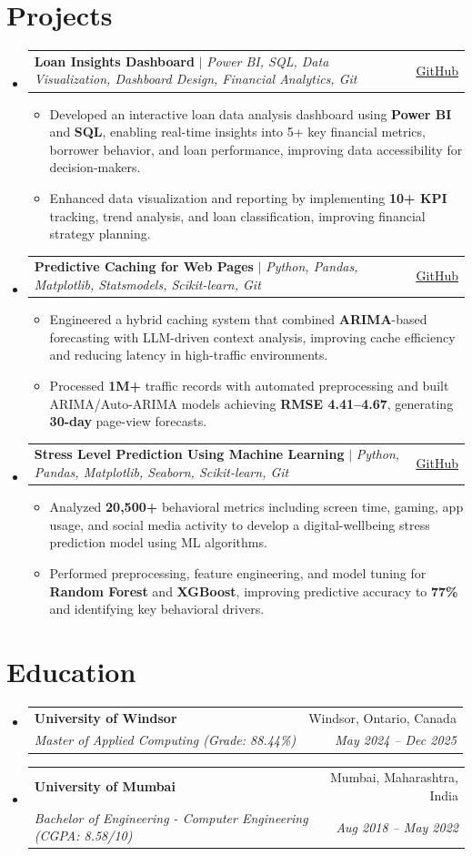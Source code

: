 \documentclass[letterpaper,10pt]{article}
\makeatletter
\newcommand{\resumeItem}[1]{
  \item\small{
    {#1 \vspace{-2pt}}
  }
}
\newcommand{\resumeSubheading}[4]{
  \vspace{-2pt}\item
    \begin{tabular*}{0.97\textwidth}[t]{l@{\extracolsep{\fill}}r}
      \textbf{#1} & #2 \\
      \textit{\small#3} & \textit{\small #4} \\
    \end{tabular*}\vspace{-7pt}
}
\newcommand{\resumeProjectHeading}[2]{
    \item
    \begin{tabular*}{0.97\textwidth}{l@{\extracolsep{\fill}}r}
      \small#1 & \small#2 \\
    \end{tabular*}\vspace{-7pt}
}
\newcommand{\resumeSubHeadingListStart}{\begin{itemize}[leftmargin=0in, label={}]}
\newcommand{\resumeSubHeadingListEnd}{\end{itemize}}
\newcommand{\resumeItemListStart}{\begin{itemize}}
\newcommand{\resumeItemListEnd}{\end{itemize}\vspace{-5pt}}
\makeatother
\begin{document}
\section{Projects}
\resumeSubHeadingListStart
\resumeProjectHeading
{\textbf{Loan Insights Dashboard} $|$ \emph{Power BI, SQL, Data Visualization, Dashboard Design, Financial Analytics, Git}}{\href{https://github.com/aaryen-dsouza/Loan_Insights_Dashboard}{\underline{GitHub}}}
\resumeItemListStart
\resumeItem{Developed an interactive loan data analysis dashboard using \textbf{Power BI} and \textbf{SQL}, enabling real-time insights into 5+ key financial metrics, borrower behavior, and loan performance, improving data accessibility for decision-makers.}
\resumeItem{Enhanced data visualization and reporting by implementing \textbf{10+ KPI} tracking, trend analysis, and loan classification, improving financial strategy planning.}
\resumeItemListEnd
\resumeProjectHeading
{\textbf{Predictive Caching for Web Pages} $|$ \emph{Python, Pandas, Matplotlib, Statsmodels, Scikit-learn, Git}}{\href{https://github.com/sharansukesh1003/COMP-8157-Final-Project}{\underline{GitHub}}}
\resumeItemListStart
\resumeItem{Engineered a hybrid caching system that combined \textbf{ARIMA}-based forecasting with LLM-driven context analysis, improving cache efficiency and reducing latency in high-traffic environments.}
\resumeItem{Processed \textbf{1M+} traffic records with automated preprocessing and built ARIMA/Auto-ARIMA models achieving \textbf{RMSE 4.41–4.67}, generating \textbf{30-day} page-view forecasts.}

\resumeItemListEnd
\resumeProjectHeading
{\textbf{Stress Level Prediction Using Machine Learning} $|$ \emph{Python, Pandas, Matplotlib, Seaborn, Scikit-learn, Git}}{\href{https://github.com/aaryen-dsouza/stress-prediction-ml}{\underline{GitHub}}}
\resumeItemListStart
\resumeItem{Analyzed \textbf{20,500+} behavioral metrics including screen time, gaming, app usage, and social media activity to develop a digital-wellbeing stress prediction model using ML algorithms.}

\resumeItem{Performed preprocessing, feature engineering, and model tuning for \textbf{Random Forest} and \textbf{XGBoost}, improving predictive accuracy to \textbf{77\%} and identifying key behavioral drivers.}


\resumeItemListEnd
\resumeSubHeadingListEnd



%

\section{Education}
\resumeSubHeadingListStart
\resumeSubheading
{University of Windsor}{Windsor, Ontario, Canada}
{Master of Applied Computing (Grade: 88.44\%)}{May 2024 -- Dec 2025}
\resumeSubheading
{University of Mumbai}{Mumbai, Maharashtra, India}
{Bachelor of Engineering - Computer Engineering (CGPA: 8.58/10)}{Aug 2018 -- May 2022}
\resumeSubHeadingListEnd

\end{document}
